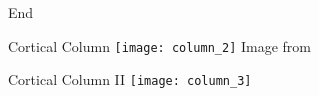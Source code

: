 
\begin{frame}[standout]
    \Huge
    End
\end{frame}

\appendix

\backupbegin

\begin{frame}[c]{Cortical Column}
    \texttt{[image: column\_2]}
    \normalsize
    Image from \cite{figcolum2}
\end{frame}

\begin{frame}[c]{Cortical Column II}
    \texttt{[image: column\_3]}
\end{frame}





\backupend

